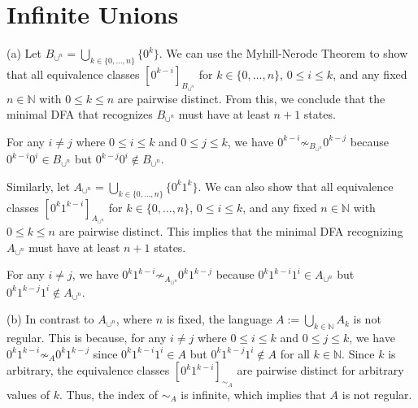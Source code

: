 




\setcounter{section}{3} %
\renewcommand{\thesection}{\arabic{section}} %

\section{Infinite Unions}

(a) Let \( B_{\cup^n} = \bigcup_{k \in \{0, \dots, n\}} \{0^k\} \). We can use the Myhill-Nerode Theorem to show that all equivalence classes \( [0^{k-i}]_{B_{\cup^n}} \) for \( k \in \{0, \dots, n\} \), \( 0 \leq i \leq k \), and any fixed \( n \in \mathbb{N} \) with \( 0 \leq k \leq n \) are pairwise distinct. From this, we conclude that the minimal DFA that recognizes \( B_{\cup^n} \) must have at least \( n + 1 \) states.

For any \( i \neq j \) where \( 0 \leq i \leq k \) and \( 0 \leq j \leq k \), we have \( 0^{k-i} \not\sim_{B_{\cup^n}} 0^{k-j} \) because \( 0^{k-i} 0^i \in B_{\cup^n} \) but \( 0^{k-j} 0^i \notin B_{\cup^n} \).

Similarly, let \( A_{\cup^n} = \bigcup_{k \in \{0, \dots, n\}} \{0^k 1^k\} \). We can also show that all equivalence classes \( [0^k 1^{k-i}]_{A_{\cup^n}} \) for \( k \in \{0, \dots, n\} \), \( 0 \leq i \leq k \), and any fixed \( n \in \mathbb{N} \) with \( 0 \leq k \leq n \) are pairwise distinct. This implies that the minimal DFA recognizing \( A_{\cup^n} \) must have at least \( n + 1 \) states.

For any \( i \neq j \), we have \( 0^k 1^{k-i} \not\sim_{A_{\cup^n}} 0^k 1^{k-j} \) because \( 0^k 1^{k-i} 1^i \in A_{\cup^n} \) but \( 0^k 1^{k-j} 1^i \notin A_{\cup^n} \).

(b) In contrast to \( A_{\cup^n} \), where \( n \) is fixed, the language \( A := \bigcup_{k \in \mathbb{N}} A_k \) is not regular. This is because, for any \( i \neq j \) where \( 0 \leq i \leq k \) and \( 0 \leq j \leq k \), we have \( 0^k 1^{k-i} \not\sim_{A} 0^k 1^{k-j} \) since \( 0^k 1^{k-i} 1^i \in A \) but \( 0^k 1^{k-j} 1^i \notin A \) for all \( k \in \mathbb{N} \). Since \( k \) is arbitrary, the equivalence classes \( [0^k 1^{k-i}]_{\sim_{A}} \) are pairwise distinct for arbitrary values of \( k \). Thus, the index of \( \sim_{A} \) is infinite, which implies that \( A \) is not regular.

